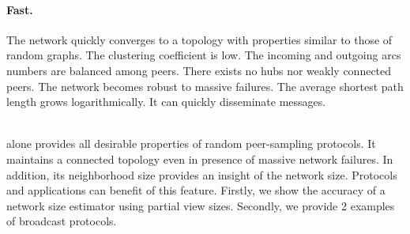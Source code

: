 \paragraph{Fast.}
The network quickly converges to a topology with properties similar to those of
random graphs. The clustering coefficient is low. The incoming and outgoing arcs
numbers are balanced among peers. There exists no hubs nor weakly connected
peers. The network becomes robust to massive failures. The average shortest path
length grows logarithmically. It can quickly disseminate messages.





\ \\ \indent \SPRAY alone provides all desirable properties of random peer-sampling
protocols. It maintains a connected topology even in presence of massive network
failures. In addition, its neighborhood size provides an insight of the network
size. Protocols and applications can benefit of this feature. Firstly, we show
the accuracy of a network size estimator using partial view sizes. Secondly, we
provide 2 examples of broadcast protocols.


